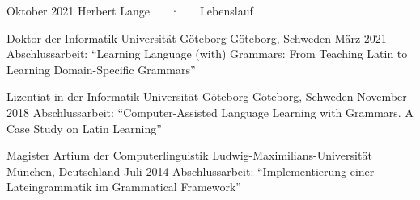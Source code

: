 \documentclass[11pt, a4]{academic-cv}
\begin{document}
\makecvheader
\makecvfooter
{ Oktober 2021 }
{ Herbert Lange ~~~·~~~ Lebenslauf}
{\thepage}


\vspace{-10px}

\begin{cventries}
\cventry
{Doktor der Informatik} %
{ Universität Göteborg} %
{Göteborg, Schweden} %
{März 2021} %
{Abschlussarbeit: ``Learning Language (with) Grammars: From Teaching Latin to Learning Domain-Specific Grammars''}

\cventry
{Lizentiat in der Informatik} %
{ Universität Göteborg} %
{Göteborg, Schweden} %
{November 2018} %
{Abschlussarbeit: ``Computer-Assisted Language Learning with Grammars. A Case Study on Latin Learning''}

\cventry
{Magister Artium der Computerlinguistik} %
{ Ludwig-Maximilians-Universität} %
{München, Deutschland} %
{Juli 2014} %
{Abschlussarbeit: ``Implementierung einer Lateingrammatik im Grammatical Framework''}


\end{cventries}
\vspace{-10px}
\end{document}
